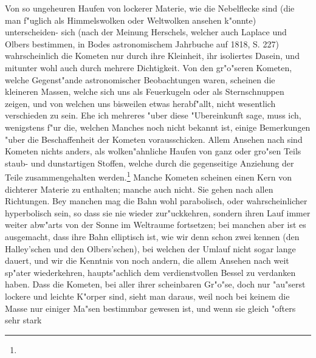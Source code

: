 \documentclass[a4paper, 11pt, oneside, polutonikogreek, german]{article}
\begin{document}
Von so ungeheuren Haufen von lockerer Materie, wie die Nebelflecke sind (die man f"uglich als Himmelswolken oder Weltwolken ansehen k"onnte) unterscheiden- sich (nach der Meinung Herschels, welcher auch Laplace und Olbers bestimmen, in Bodes astronomischem Jahrbuche auf 1818, S. 227) wahrscheinlich die Kometen nur durch ihre Kleinheit, ihr isoliertes Dasein, und mitunter wohl auch durch mehrere Dichtigkeit. Von den gr"o"seren Kometen, welche Gegenst"ande astronomischer Beobachtungen waren, scheinen die kleineren Massen, welche sich uns als Feuerkugeln oder als Sternschnuppen zeigen, und von welchen uns bisweilen etwas herabf"allt, nicht wesentlich verschieden zu sein. Ehe ich mehreres "uber diese "Ubereinkunft sage, muss ich, wenigstens f"ur die, welchen Manches noch nicht bekannt ist, einige Bemerkungen "uber die Beschaffenheit der Kometen vorausschicken. Allem Ansehen nach sind Kometen nichts anders, als wolken"ahnliche Haufen von ganz oder gro"sen Teils staub- und dunstartigen Stoffen, welche durch die gegenseitige Anziehung der Teile zusammengehalten werden.\footnote{} Manche Kometen scheinen einen Kern von dichterer Materie zu enthalten; manche auch nicht. Sie gehen nach allen Richtungen. Bey manchen mag die Bahn wohl parabolisch, oder wahrscheinlicher hyperbolisch sein, so dass sie nie wieder zur"uckkehren, sondern ihren Lauf immer weiter abw"arts von der Sonne im Weltraume fortsetzen; bei manchen aber ist es ausgemacht, dass ihre Bahn elliptisch ist, wie wir denn schon zwei kennen (den Halley'schen und den Olbers'schen), bei welchen der Umlauf nicht sogar lange dauert, und wir die Kenntnis von noch andern, die allem Ansehen nach weit sp"ater wiederkehren, haupts"achlich dem verdienstvollen Bessel zu verdanken haben. Dass die Kometen, bei aller ihrer scheinbaren Gr"o"se, doch nur "au"serst lockere und leichte K"orper sind, sieht man daraus, weil noch bei keinem die Masse nur einiger Ma"sen bestimmbar gewesen ist, und wenn sie gleich "ofters sehr stark 
\end{document}
